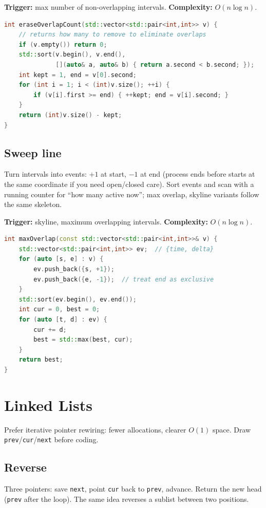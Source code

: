 \textbf{Trigger:} max number of non-overlapping intervals.
\newline
\textbf{Complexity:} $O(n\log n)$.

\begin{lstlisting}[language=C++]
int eraseOverlapCount(std::vector<std::pair<int,int>> v) {
    // returns how many to remove to eliminate overlaps
    if (v.empty()) return 0;
    std::sort(v.begin(), v.end(),
              [](auto& a, auto& b) { return a.second < b.second; });
    int kept = 1, end = v[0].second;
    for (int i = 1; i < (int)v.size(); ++i) {
        if (v[i].first >= end) { ++kept; end = v[i].second; }
    }
    return (int)v.size() - kept;
}
\end{lstlisting}

\subsection{Sweep line}
\label{subsec:pat-sweep}
Turn intervals into events: $+1$ at start, $-1$ at end (process ends before
starts at the same coordinate if you need open/closed care). Sort events and
scan with a running counter for ``how many active now''; max overlap, skyline
variants follow the same skeleton.

\textbf{Trigger:} skyline, maximum overlapping intervals.
\newline
\textbf{Complexity:} $O(n\log n)$.

\begin{lstlisting}[language=C++]
int maxOverlap(const std::vector<std::pair<int,int>>& v) {
    std::vector<std::pair<int,int>> ev;  // {time, delta}
    for (auto [s, e] : v) {
        ev.push_back({s, +1});
        ev.push_back({e, -1});  // treat end as exclusive
    }
    std::sort(ev.begin(), ev.end());
    int cur = 0, best = 0;
    for (auto [t, d] : ev) {
        cur += d;
        best = std::max(best, cur);
    }
    return best;
}
\end{lstlisting}

\section{Linked Lists}
\label{sec:pat-linked-lists}
Prefer iterative pointer rewiring: fewer allocations, clearer $O(1)$ space.
Draw \texttt{prev}/\texttt{cur}/\texttt{next} before coding.

\subsection{Reverse}
\label{subsec:pat-ll-reverse}
Three pointers: save \texttt{next}, point \texttt{cur} back to \texttt{prev},
advance. Return the new head (\texttt{prev} after the loop). The same idea
reverses a sublist between two positions.


